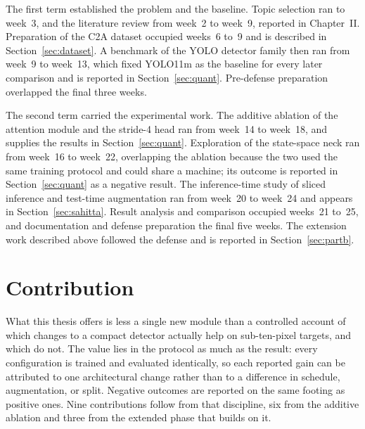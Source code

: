 \documentclass[12pt,a4paper,oneside]{report}
\begin{document}
The first term established the problem and the baseline. Topic selection ran to
week~3, and the literature review from week~2 to week~9, reported in
Chapter~II. Preparation of the C2A dataset occupied weeks~6 to~9 and is
described in Section~\ref{sec:dataset}. A benchmark of the YOLO detector family
then ran from week~9 to week~13, which fixed YOLO11m as the baseline for every
later comparison and is reported in Section~\ref{sec:quant}. Pre-defense preparation overlapped
the final three weeks.

The second term carried the experimental work. The additive ablation of the
attention module and the stride-4 head ran from week~14 to week~18, and supplies
the results in Section~\ref{sec:quant}. Exploration of the state-space neck ran from week~16
to week~22, overlapping the ablation because the two used the same training
protocol and could share a machine; its outcome is reported in Section~\ref{sec:quant} as a
negative result. The inference-time study of sliced inference and test-time
augmentation ran from week~20 to week~24 and appears in
Section~\ref{sec:sahitta}. Result
analysis and comparison occupied weeks~21 to~25, and documentation and defense
preparation the final five weeks. The extension work described above followed
the defense and is reported in Section~\ref{sec:partb}.

\section{Contribution}

What this thesis offers is less a single new module than a controlled account of
which changes to a compact detector actually help on sub-ten-pixel targets, and
which do not. The value lies in the protocol as much as the result: every
configuration is trained and evaluated identically, so each reported gain can be
attributed to one architectural change rather than to a difference in schedule,
augmentation, or split. Negative outcomes are reported on the same footing as
positive ones. Nine contributions follow from that discipline, six from the
additive ablation and three from the extended phase that builds on it.
\end{document}

